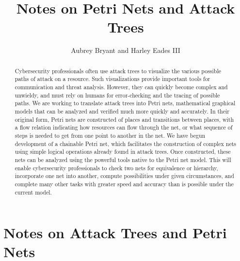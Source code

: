 \documentclass{article}
\title{Notes on Petri Nets and Attack Trees}
\author{Aubrey Bryant and Harley Eades III}
\begin{document}
\maketitle 

\begin{abstract}
  Cybersecurity professionals often use attack trees to visualize the various possible paths of attack on a resource. Such visualizations provide important tools for communication and threat analysis. However, they can quickly become complex and unwieldy, and must rely on humans for error-checking and the tracing of possible paths. We are working to translate attack trees into Petri nets, mathematical graphical models that can be analyzed and verified much more quickly and accurately. In their original form, Petri nets are constructed of places and transitions between places, with a flow relation indicating how resources can flow through the net, or what sequence of steps is needed to get from one point to another in the net. We have begun development of a chainable Petri net, which facilitates the construction of complex nets using simple logical operations already found in attack trees. Once constructed, these nets can be analyzed using the powerful tools native to the Petri net model. This will enable cybersecurity professionals to check two nets for equivalence or hierarchy, incorporate one net into another, compute possibilities under given circumstances, and complete many other tasks with greater speed and accuracy than is possible under the current model.
\end{abstract}

\section{Notes on Attack Trees and Petri Nets}

\nocite{*}


\end{document}
